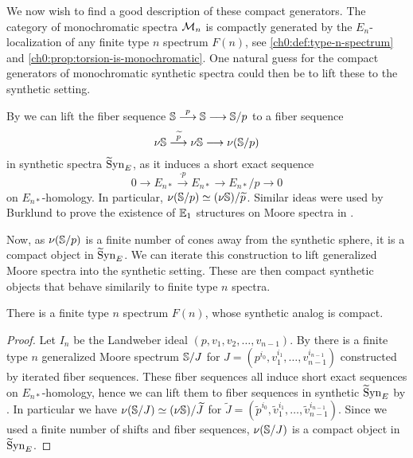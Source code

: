 
We now wish to find a good description of these compact generators. The category of monochromatic spectra $\Mn$ is compactly generated by the $E_n$-localization of any finite type $n$ spectrum $F(n)$, see \cref{ch0:def:type-n-spectrum} and \cref{ch0:prop:torsion-is-monochromatic}. One natural guess for the compact generators of monochromatic synthetic spectra could then be to lift these to the synthetic setting. 

\begin{construction}
    By \cite[4.23]{pstragowski_2022} we can lift the fiber sequence $\S\overset{p}\to\S\to\S/p$ to a fiber sequence 
    \[\nu \S \overset{\widetilde{p}}\to \nu \S\to \nu (\S/p)\] 
    in synthetic spectra $\hSynE$, as it induces a short exact sequence 
    \[0\to E_{n*} \overset{\cdot p}\to E_{n*}\to E_{n*}/p\to 0\]
    on $E_{n*}$-homology. In particular, $\nu (\S/p)\simeq (\nu \S)/\widetilde{p}$. Similar ideas were used by Burklund to prove the existence of $\E_1$ structures on Moore spectra in \cite{burklund_2022}. 
    
    Now, as $\nu (\S/p)$ is a finite number of cones away from the synthetic sphere, it is a compact object in $\hSynE$. We can iterate this construction to lift generalized Moore spectra into the synthetic setting. These are then compact synthetic objects that behave similarily to finite type $n$ spectra. 
\end{construction}

\begin{lemma}
    There is a finite type $n$ spectrum $F(n)$, whose synthetic analog is compact. 
\end{lemma}
\begin{proof}
    Let $I_n$ be the Landweber ideal $(p,v_1, v_2, \ldots, v_{n-1})$. By \cite[4.14]{hovey-strickland_99} there is a finite type $n$ generalized Moore spectrum $\S/J$ for $J=(p^{i_0}, v_1^{i_1}, \ldots, v_{n-1}^{i_{n-1}})$ constructed by iterated fiber sequences. These fiber sequences all induce short exact sequences on $E_{n*}$-homology, hence we can lift them to fiber sequences in synthetic $\hSynE$ by \cite[4.23]{pstragowski_2022}. In particular we have $\nu (\S/J) \simeq (\nu \S)/\widetilde{J}$ for $\widetilde{J} = (\widetilde{p}^{i_0}, \widetilde{v}_1^{i_1}, \ldots, \widetilde{v}_{n-1}^{i_{n-1}})$. Since we used a finite number of shifts and fiber sequences, $\nu (\S/J)$ is a compact object in $\hSynE$. 
\end{proof}

